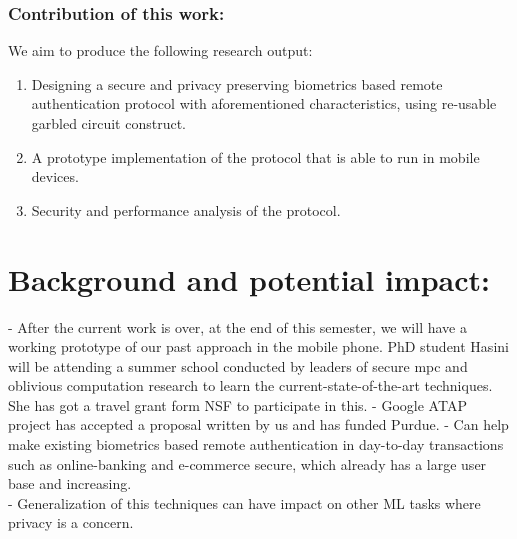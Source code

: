 \documentclass[10pt]{article}
\begin{document}
\subsubsection*{Contribution of this work:}
We aim to produce the following research output:
\begin{enumerate}
 \item Designing a secure and privacy preserving biometrics based remote authentication protocol with aforementioned characteristics, using re-usable 
garbled circuit construct. 
 \item A prototype implementation of the protocol that is able to run in mobile devices.
 \item Security and performance analysis of the protocol.
\end{enumerate}


\section{Background and potential impact:}
- After the current work is over, at the end of this semester, we will have a working prototype of our past approach in the mobile phone. PhD student 
Hasini will be attending a summer school conducted by leaders of secure mpc and oblivious computation research to learn the current-state-of-the-art 
techniques. She has got a travel grant form NSF to participate in this.
- Google ATAP project has accepted a proposal written by us and has funded Purdue.
- Can help make existing biometrics based remote authentication in day-to-day transactions such as online-banking and e-commerce secure, which 
already has a large user base and increasing.\\
- Generalization of this techniques can have impact on other ML tasks where privacy is a concern.
\footnotesize


 
\end{document}
